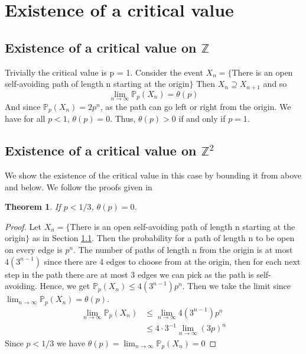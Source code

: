 \documentclass[a4paper,11pt]{article}
\newtheorem{theorem}{Theorem}[section]
\theoremstyle{definition}
\newcommand{\ints}{\mathbb{Z}}
\newcommand{\prob}{\mathbb{P}_p}
\begin{document}
\section{Existence of a critical value}
\subsection {Existence of a critical value on $\ints$}\label{critvalforZ}
Trivially the critical value is p = 1. Consider the event $X_n = \{$There is an open self-avoiding path of length n starting at the origin$\}$ 
Then $X_n \supseteq X_{n+1}$ and so 
$$\lim_{n\rightarrow \infty} \prob (X_n) = \theta(p)$$
And since $\prob (X_n) = 2p^n$, as the path can go left or right from the origin. We have for all $p <1$, $\theta(p) = 0$. Thus, $\theta(p) > 0$ if and only if $p = 1$. 


\subsection {Existence of a critical value on $\ints^2$} \label{critvalZ2}
We show the existence of the critical value in this case by bounding it from above and below. We follow the proofs given in \cite{steif2011mini}
\begin{theorem}
	If $p < 1/3$, $\theta(p) = 0$.
\end{theorem}
\begin{proof}
	Let $X_n = \{$There is an open self-avoiding path of length n starting at the origin$\}$ as in Section \ref{critvalforZ}.
	Then the probability for a path of length n to be open on every edge is $p^n$. The number of paths of length n from the origin is at most $4(3^{n-1})$ since there are 4 edges to choose from at the origin, then for each next step in the path there are at most 3 edges we can pick as the path is self-avoiding.
	Hence, we get $\prob(X_n) \leq  4(3^{n-1})p^n  $. Then we take the limit since
	$\lim_{n\rightarrow \infty}\prob(X_n) = \theta(p)$.
	\begin{align*}
		\lim_{n\rightarrow \infty}\prob(X_n) &\leq  \lim_{n\rightarrow \infty}4(3^{n-1})p^n\\
		 &\leq 4\cdot  3^{-1} \lim_{n\rightarrow \infty}(3p)^{n}
	 \end{align*}
	 Since $p < 1/3$ we have $\theta(p)=\lim_{n\rightarrow \infty}\prob(X_n) = 0$
\end{proof}
\end{document}
